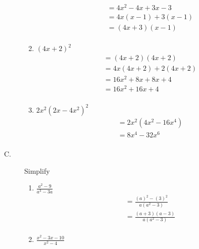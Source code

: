 \documentclass{article}
\begin{document}
\begin{description}
\begin{enumerate}
\begin{equation}
                      \begin{split}
                          & = 4x^2 -4x + 3x - 3\\
                          & = 4x(x-1)+3(x-1)\\
                          & = (4x+3)(x-1)\\
                      \end{split}
                  \end{equation}
            \item $ (4x + 2)^2 $
                  \begin{equation}
                      \begin{split}
                          & = (4x+2)(4x+2) \\
                          & = 4x(4x+2) +2(4x+2)\\
                          & = 16x^2 +8x +8x +4\\
                          & = 16x^2 + 16x + 4 \\
                      \end{split}
                  \end{equation}
            \item $ 2x^2(2x-4x^2)^2 $
                  \begin{equation}
                      \begin{split}
                          & = 2x^2(4x^2 - 16x^4)\\
                          & = 8x^4 - 32x^6\\
                      \end{split}
                  \end{equation}
        \end{enumerate}
    \item[C. ] Simplify
        \begin{enumerate}
            \item $\frac{a^2 - 9}{a^3-3a}$
                  \begin{equation}
                      \begin{split}
                          & = \frac{(a)^2 - (3)^2}{a(a^2 - 3)}\\
                          & = \frac{(a+3)(a-3)}{a(a^2-3)}\\
                      \end{split}
                  \end{equation}
            \item $\frac{x^2 - 3x - 10}{x^2-4}$

\end{enumerate}
\end{description}
\end{document}
